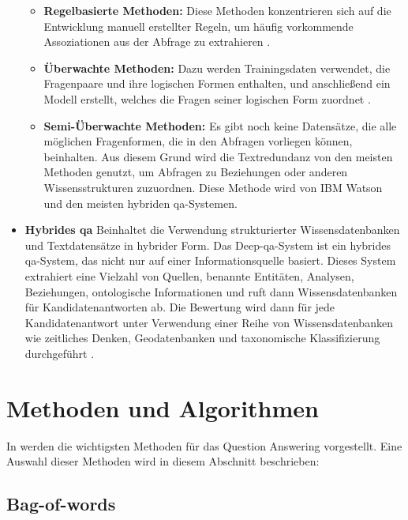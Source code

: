 \documentclass[
        ngerman,
        paper=a4,
        numbers=noendperiod,
]{scrreprt}
\begin{document}
\begin{itemize}
    \begin{itemize}
        \item \textbf{Regelbasierte Methoden:} Diese Methoden konzentrieren sich auf die Entwicklung manuell erstellter Regeln, um häufig vorkommende Assoziationen aus der Abfrage zu extrahieren \citep{ravichandran2002learning}.
        \item \textbf{Überwachte Methoden:} Dazu werden Trainingsdaten verwendet, die Fragenpaare und ihre logischen Formen enthalten, und anschließend ein Modell erstellt, welches die Fragen seiner logischen Form zuordnet \citep{tirpude2015closed}.
        \item \textbf{Semi-Überwachte Methoden:} 
        Es gibt noch keine Datensätze, die alle möglichen Fragenformen, die in den Abfragen vorliegen können, beinhalten. Aus diesem Grund wird die Textredundanz von den meisten Methoden genutzt, um Abfragen zu Beziehungen oder anderen Wissensstrukturen zuzuordnen. Diese Methode wird von IBM Watson \citep{high2012era} und den meisten hybriden \ac{qa}-Systemen. 
    \end{itemize}
    \item \textbf{Hybrides \ac{qa}}  Beinhaltet die Verwendung strukturierter Wissensdatenbanken und Textdatensätze in hybrider Form. Das Deep-\ac{qa}-System \citep{ferrucci2010building} ist ein hybrides \ac{qa}-System, das nicht nur auf einer Informationsquelle basiert. Dieses System extrahiert eine Vielzahl von Quellen, benannte Entitäten, Analysen, Beziehungen, ontologische Informationen und ruft dann  Wissensdatenbanken für Kandidatenantworten ab. Die Bewertung wird dann für jede Kandidatenantwort unter Verwendung einer Reihe von Wissensdatenbanken wie zeitliches Denken, Geodatenbanken und taxonomische Klassifizierung durchgeführt \citep[S. 479 - 483]{Jurafsky2014SpeechProcessing}.
\end{itemize}








\section{Methoden und Algorithmen}
In \citep [S. 5418 - 5427]{Kolomiyets2011APerspective} werden die wichtigsten Methoden für das Question Answering vorgestellt. Eine Auswahl dieser Methoden wird in diesem Abschnitt beschrieben:
\subsection{Bag-of-words}
\end{document}
